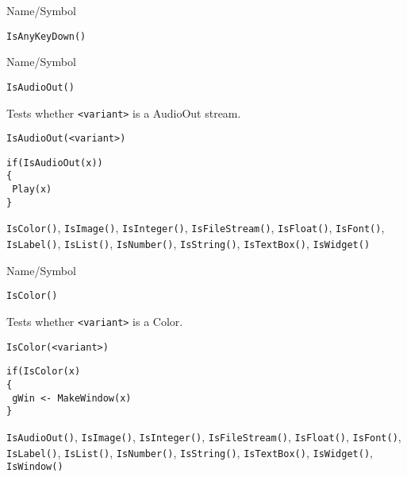 \begin{desc}{Name/Symbol}
\item[Name/Symbol]	\verb+IsAnyKeyDown()+

\item[Description]	

\item[Usage]		

\item[Example]	

\item[See Also]	
\end{desc}

\rl


\begin{desc}{Name/Symbol}
\item[Name/Symbol]	\verb+IsAudioOut()+

\item[Description]	Tests whether \verb+<variant>+ is a AudioOut stream.

\item[Usage]
\begin{verbatim}
IsAudioOut(<variant>)
\end{verbatim}

\item[Example]
\begin{verbatim}
if(IsAudioOut(x))
{
 Play(x)
}
\end{verbatim}

\item[See Also] \verb+IsColor()+, \verb+IsImage()+,
  \verb+IsInteger()+, \verb+IsFileStream()+, \verb+IsFloat()+,
  \verb+IsFont()+, \verb+IsLabel()+, \verb+IsList()+,
  \verb+IsNumber()+, \verb+IsString()+, \verb+IsTextBox()+,
  \verb+IsWidget()+
\end{desc}

\rl


\begin{desc}{Name/Symbol}
\item[Name/Symbol]	\verb+IsColor()+

\item[Description]	Tests whether \verb+<variant>+ is a Color.

\item[Usage]
\begin{verbatim}
IsColor(<variant>)
\end{verbatim}

\item[Example]
\begin{verbatim}
if(IsColor(x)
{
 gWin <- MakeWindow(x)
}
\end{verbatim}

\item[See Also] \verb+IsAudioOut()+, \verb+IsImage()+,
  \verb+IsInteger()+, \verb+IsFileStream()+, \verb+IsFloat()+,
  \verb+IsFont()+, \verb+IsLabel()+, \verb+IsList()+,
  \verb+IsNumber()+, \verb+IsString()+, \verb+IsTextBox()+,
  \verb+IsWidget()+, \verb+IsWindow()+
\end{desc}

